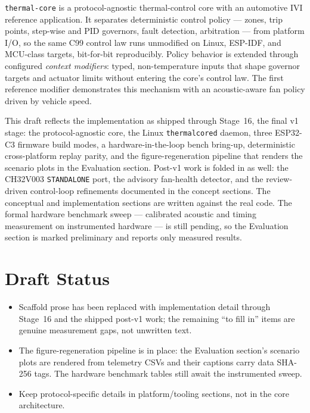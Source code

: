\documentclass[11pt,a4paper]{article}
\begin{document}
\texttt{thermal-core} is a protocol-agnostic thermal-control core with an automotive IVI reference application. It separates deterministic control policy --- zones, trip points, step-wise and PID governors, fault detection, arbitration --- from platform I/O, so the same C99 control law runs unmodified on Linux, ESP-IDF, and MCU-class targets, bit-for-bit reproducibly. Policy behavior is extended through configured \emph{context modifiers}: typed, non-temperature inputs that shape governor targets and actuator limits without entering the core's control law. The first reference modifier demonstrates this mechanism with an acoustic-aware fan policy driven by vehicle speed.

This draft reflects the implementation as shipped through Stage~16, the final v1 stage: the protocol-agnostic core, the Linux \texttt{thermalcored} daemon, three ESP32-C3 firmware build modes, a hardware-in-the-loop bench bring-up, deterministic cross-platform replay parity, and the figure-regeneration pipeline that renders the scenario plots in the Evaluation section. Post-v1 work is folded in as well: the CH32V003 \texttt{STANDALONE} port, the advisory fan-health detector, and the review-driven control-loop refinements documented in the concept sections. The conceptual and implementation sections are written against the real code. The formal hardware benchmark sweep --- calibrated acoustic and timing measurement on instrumented hardware --- is still pending, so the Evaluation section is marked preliminary and reports only measured results.

\section*{Draft Status}

\begin{itemize}[leftmargin=*]
    \item Scaffold prose has been replaced with implementation detail through Stage~16 and the shipped post-v1 work; the remaining ``to fill in'' items are genuine measurement gaps, not unwritten text.
    \item The figure-regeneration pipeline is in place: the Evaluation section's scenario plots are rendered from telemetry CSVs and their captions carry data SHA-256 tags. The hardware benchmark tables still await the instrumented sweep.
    \item Keep protocol-specific details in platform/tooling sections, not in the core architecture.
\end{itemize}
\end{document}
